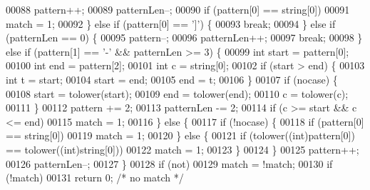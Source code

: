 \begin{DoxyCode}
00088                     pattern++;
00089                     patternLen--;
00090                     \textcolor{keywordflow}{if} (pattern[0] == string[0])
00091                         match = 1;
00092                 \} \textcolor{keywordflow}{else} \textcolor{keywordflow}{if} (pattern[0] == \textcolor{stringliteral}{']'}) \{
00093                     \textcolor{keywordflow}{break};
00094                 \} \textcolor{keywordflow}{else} \textcolor{keywordflow}{if} (patternLen == 0) \{
00095                     pattern--;
00096                     patternLen++;
00097                     \textcolor{keywordflow}{break};
00098                 \} \textcolor{keywordflow}{else} \textcolor{keywordflow}{if} (pattern[1] == \textcolor{stringliteral}{'-'} && patternLen >= 3) \{
00099                     \textcolor{keywordtype}{int} start = pattern[0];
00100                     \textcolor{keywordtype}{int} end = pattern[2];
00101                     \textcolor{keywordtype}{int} c = string[0];
00102                     \textcolor{keywordflow}{if} (start > end) \{
00103                         \textcolor{keywordtype}{int} t = start;
00104                         start = end;
00105                         end = t;
00106                     \}
00107                     \textcolor{keywordflow}{if} (nocase) \{
00108                         start = tolower(start);
00109                         end = tolower(end);
00110                         c = tolower(c);
00111                     \}
00112                     pattern += 2;
00113                     patternLen -= 2;
00114                     \textcolor{keywordflow}{if} (c >= start && c <= end)
00115                         match = 1;
00116                 \} \textcolor{keywordflow}{else} \{
00117                     \textcolor{keywordflow}{if} (!nocase) \{
00118                         \textcolor{keywordflow}{if} (pattern[0] == string[0])
00119                             match = 1;
00120                     \} \textcolor{keywordflow}{else} \{
00121                         \textcolor{keywordflow}{if} (tolower((\textcolor{keywordtype}{int})pattern[0]) == tolower((\textcolor{keywordtype}{int})string[0]))
00122                             match = 1;
00123                     \}
00124                 \}
00125                 pattern++;
00126                 patternLen--;
00127             \}
00128             \textcolor{keywordflow}{if} (\textcolor{keyword}{not})
00129                 match = !match;
00130             \textcolor{keywordflow}{if} (!match)
00131                 \textcolor{keywordflow}{return} 0; \textcolor{comment}{/* no match */}

\end{DoxyCode}

